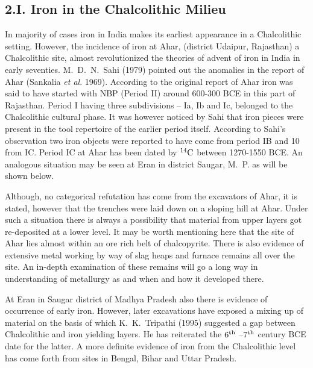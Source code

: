 \vspace{-.48cm}

\subsection*{2.I. Iron in the Chalcolithic Milieu}\label{chapter3-subsection-4}

\vspace{-.2cm}

In majority of cases iron in India makes its earliest appearance in a Chalcolithic setting. However, the incidence of iron at Ahar, (district Udaipur, Rajasthan) a Chalcolithic site, almost revolutionized the theories of advent of iron in India in early seventies. M.~D.~N.~Sahi (1979) pointed out the anomalies in the report of Ahar (Sankalia \textit{et al}. 1969). According to the original report of Ahar iron was said to have started with NBP (Period II) around 600-300 BCE in this part of Rajasthan. Period I having three subdivisions – Ia, Ib and Ic, belonged to the Chalcolithic cultural phase. It was however noticed by Sahi that iron pieces were present in the tool repertoire of the earlier period itself. According to Sahi’s observation two iron objects were reported to have come from period IB and 10 from IC. Period IC at Ahar has been dated by $^{14}{\rm C}$ between 1270-1550 BCE. An analogous situation may be seen at Eran in district Saugar, M.~P. as will be shown below.

Although, no categorical refutation has come from the excavators of Ahar, it is stated, however that the trenches were laid down on a sloping hill at Ahar. Under such a situation there is always a possibility that material from upper layers got re-deposited at a lower level. It may be worth mentioning here that the site of Ahar lies almost within an ore rich belt of chalcopyrite. There is also evidence of extensive metal working by way of slag heaps and furnace remains all over the site. An in-depth examination of these remains will go a long way in understanding of metallurgy as and when and how it developed there.

At Eran in Saugar district of Madhya Pradesh also there is evidence of occurrence of early iron. However, later excavations have exposed a mixing up of material on the basis of which K.~K.~Tripathi (1995) suggested a gap between Chalcolithic and iron yielding layers. He has reiterated the $6^{\rm th}$ –$7^{\rm th}$ century BCE date for the latter. A more definite evidence of iron from the Chalcolithic level has come forth from sites in Bengal, Bihar and Uttar Pradesh.

